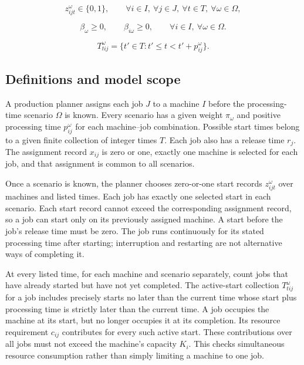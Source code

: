 \documentclass[10pt]{article}
\begin{document}
\begin{equation}
z_{ijt}^{\omega} \in \{0,1\},
\qquad \forall i \in I,\ \forall j \in J,\ \forall t \in T,\ \forall \omega \in \Omega,
\tag{M10}
\end{equation}

\begin{equation}
\beta_\omega \ge 0,
\qquad
\beta_{i\omega} \ge 0,
\qquad \forall i \in I,\ \forall \omega \in \Omega.
\tag{M11}
\end{equation}

\[
T_{tij}^{\omega}=\{t'\in T:t'\le t<t'+p_{ij}^{\omega}\}.
\]

\subsection*{Definitions and model scope}
A production planner assigns each job $J$ to a machine $I$ before the processing-time scenario $\Omega$ is known. Every scenario has a given weight $\pi_\omega$ and positive processing time $p_{ij}^{\omega}$ for each machine--job combination. Possible start times belong to a given finite collection of integer times $T$. Each job also has a release time $r_j$. The assignment record $x_{ij}$ is zero or one, exactly one machine is selected for each job, and that assignment is common to all scenarios.

Once a scenario is known, the planner chooses zero-or-one start records $z_{ijt}^{\omega}$ over machines and listed times. Each job has exactly one selected start in each scenario. Each start record cannot exceed the corresponding assignment record, so a job can start only on its previously assigned machine. A start before the job's release time must be zero. The job runs continuously for its stated processing time after starting; interruption and restarting are not alternative ways of completing it.

At every listed time, for each machine and scenario separately, count jobs that have already started but have not yet completed. The active-start collection $T_{tij}^{\omega}$ for a job includes precisely starts no later than the current time whose start plus processing time is strictly later than the current time. A job occupies the machine at its start, but no longer occupies it at its completion. Its resource requirement $c_{ij}$ contributes for every such active start. These contributions over all jobs must not exceed the machine's capacity $K_i$. This checks simultaneous resource consumption rather than simply limiting a machine to one job.
\end{document}

